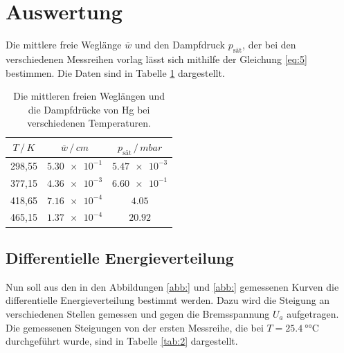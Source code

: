 \section{Auswertung}

Die mittlere freie Weglänge $\overline{w}$ und den Dampfdruck $p_\text{sät}$, der bei den verschiedenen
Messreihen vorlag lässt sich mithilfe der Gleichung \ref{eq:5} bestimmen. Die Daten
sind in Tabelle \ref{tab:1} dargestellt.

\begin{table}
  \centering
  \caption{Die mittleren freien Weglängen und die Dampfdrücke von Hg bei verschiedenen
  Temperaturen.}
  \label{tab:1}
  \begin{tabular}{c c c}
    \toprule
    $T \, / \, K$ & $\overline{w} \, / \, cm$ & $p_\text{sät} \, / \, mbar$ \\
    \midrule
    298,55 & $\num{5.30e-1}$ & $\num{5.47e-3}$ \\
    377,15 & $\num{4.36e-3}$ & $\num{6.60e-1}$ \\
    418,65 & $\num{7.16e-4}$ & $\num{4.05}$    \\
    465,15 & $\num{1.37e-4}$ & $\num{20.92}$ \\
    \bottomrule
  \end{tabular}
\end{table}

\subsection{Differentielle Energieverteilung}

Nun soll aus den in den Abbildungen \ref{abb:} und \ref{abb:} gemessenen Kurven
die differentielle Energieverteilung bestimmt werden. Dazu wird die Steigung
an verschiedenen Stellen gemessen und gegen die Bremsspannung $U_a$ aufgetragen.
Die gemessenen Steigungen von der ersten Messreihe, die bei $T = \SI{25.4}{\degree\celsius}$
durchgeführt wurde, sind in Tabelle \ref{tab:2} dargestellt.

